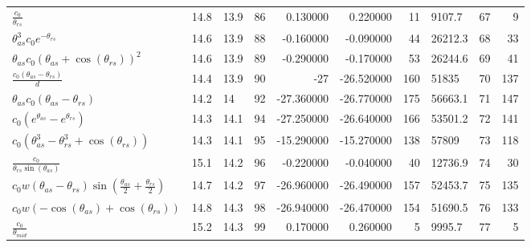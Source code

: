 \begin{tabularx}{\textwidth}{lllrrrrlrr}
$ \displaystyle\frac{c_{0}}{\theta_{rs}} $  &  14.8  &  13.9  &  86  &  0.130000  &  0.220000  &  11  &  9107.7  &  67\phantom{.000000}  &  9\phantom{.000000}  \\ 
$ \theta_{as}^{3} c_{0} e^{- \theta_{rs}} $  &  14.6  &  13.9  &  88  &  -0.160000  &  -0.090000  &  44  &  26212.3  &  68\phantom{.000000}  &  33\phantom{.000000}  \\ 
$ \theta_{as} c_{0} \left(\theta_{as} + \cos{\left(\theta_{rs} \right)}\right)^{2} $  &  14.6  &  13.9  &  89  &  -0.290000  &  -0.170000  &  53  &  26244.6  &  69\phantom{.000000}  &  41\phantom{.000000}  \\ 
$ \displaystyle\frac{c_{0} \left(\theta_{as} - \theta_{rs}\right)}{d} $  &  14.4  &  13.9  &  90  &  -27\phantom{.000000}  &  -26.520000  &  160  &  51835\phantom{.0}  &  70\phantom{.000000}  &  137\phantom{.000000}  \\ 
$ \theta_{as} c_{0} \left(\theta_{as} - \theta_{rs}\right) $  &  14.2  &  14\phantom{.0}  &  92  &  -27.360000  &  -26.770000  &  175  &  56663.1  &  71\phantom{.000000}  &  147\phantom{.000000}  \\ 
$ c_{0} \left(e^{\theta_{as}} - e^{\theta_{rs}}\right) $  &  14.3  &  14.1  &  94  &  -27.250000  &  -26.640000  &  166  &  53501.2  &  72\phantom{.000000}  &  141\phantom{.000000}  \\ 
$ c_{0} \left(\theta_{as}^{3} - \theta_{rs}^{3} + \cos{\left(\theta_{rs} \right)}\right) $  &  14.3  &  14.1  &  95  &  -15.290000  &  -15.270000  &  138  &  57809\phantom{.0}  &  73\phantom{.000000}  &  118\phantom{.000000}  \\ 
$ \displaystyle\frac{c_{0}}{\theta_{rs} \sin{\left(\theta_{as} \right)}} $  &  15.1  &  14.2  &  96  &  -0.220000  &  -0.040000  &  40  &  12736.9  &  74\phantom{.000000}  &  30\phantom{.000000}  \\ 
$ c_{0} w \left(\theta_{as} - \theta_{rs}\right) \sin{\left(\displaystyle\frac{\theta_{as}}{2} + \displaystyle\frac{\theta_{rs}}{2} \right)} $  &  14.7  &  14.2  &  97  &  -26.960000  &  -26.490000  &  157  &  52453.7  &  75\phantom{.000000}  &  135\phantom{.000000}  \\ 
$ c_{0} w \left(- \cos{\left(\theta_{as} \right)} + \cos{\left(\theta_{rs} \right)}\right) $  &  14.8  &  14.3  &  98  &  -26.940000  &  -26.470000  &  154  &  51690.5  &  76\phantom{.000000}  &  133\phantom{.000000}  \\ 
$ \displaystyle\frac{c_{0}}{\theta_{mid}} $  &  15.2  &  14.3  &  99  &  0.170000  &  0.260000  &  5  &  9995.7  &  77\phantom{.000000}  &  5\phantom{.000000}  \\ 

\end{tabularx}
